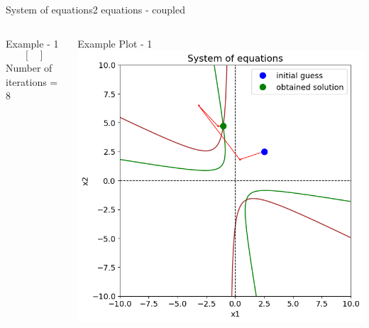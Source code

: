 \documentclass{beamer}
\begin{document}
\begin{frame}{System of equations}{2 equations - coupled}
\begin{columns}[t]
\begin{block}{\footnotesize Example - 1}
\[\begin{bmatrix}
                \end{bmatrix}
            \]
            Number of iterations = 8
        \end{block}
        \begin{block}{\footnotesize Example Plot - 1}
            \scriptsize
            \includegraphics[width=\textwidth]{Figures/syseqns_1.png}
        \end{block}
        \vfill
    \end{columns}
\end{frame}
\end{document}
